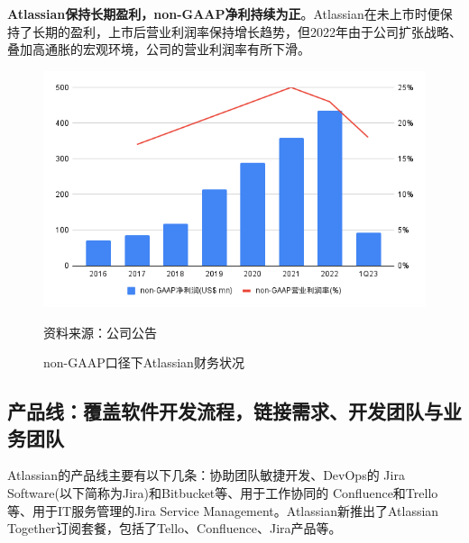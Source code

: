 \textbf{Atlassian保持长期盈利，non-GAAP净利持续为正}。Atlassian在未上市时便保持了长期的盈利，上市后营业利润率保持增长趋势，但2022年由于公司扩张战略、叠加高通胀的宏观环境，公司的营业利润率有所下滑。
\begin{figure}[H]
    \caption{non-GAAP口径下Atlassian财务状况}
    \begin{center}
        \includegraphics[width=\linewidth]{img/non-GAAP.png}
    \end{center}
    \footnotesize{资料来源：公司公告}
\end{figure}

\subsection{产品线：覆盖软件开发流程，链接需求、开发团队与业务团队}
Atlassian的产品线主要有以下几条：协助团队敏捷开发、DevOps的 Jira Software(以下简称为Jira)和Bitbucket等、用于工作协同的 Confluence和Trello等、用于IT服务管理的Jira Service Management。Atlassian新推出了Atlassian Together订阅套餐，包括了Tello、Confluence、Jira产品等。

